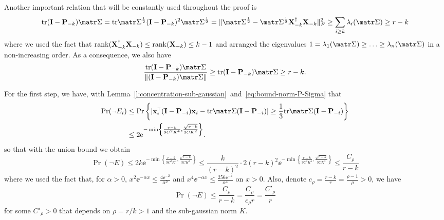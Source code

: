 \documentclass[../../thesis.tex]{subfiles}
\begin{document}

Another important relation that will be constantly used throughout the proof is
\begin{equation}\label{eq:bound-trace-P-Sigma}
  \tr (\I - \P_{-k}) \Sigmab = \tr \Sigmab^{\frac12} (\I - \P_{-k})^2 \Sigmab^{\frac12} =
  \|\Sigmab^{\frac12}-\Sigmab^{\frac12}\X_{-k}^\dagger\X_{-k}\|_F^2\geq
  \sum_{i\geq k}\lambda_i (\Sigmab)\geq r-k
\end{equation}
where we used the fact that $\mathrm{rank}(\mathbf X_{-k}^\dagger \mathbf X_{-k}) \le \mathrm{rank}(\mathbf X_{-k}) \le k-1$ and arranged the eigenvalues $ 1 = \lambda_1(\Sigmab) \ge \ldots \ge \lambda_n(\Sigmab)$ in a non-increasing order. As a consequence, we also have
\begin{equation}\label{eq:bound-norm-P-Sigma}
  \frac{\tr (\I - \P_{-k}) \Sigmab}{ \|  (\I - \P_{-k}) \Sigmab \| } \ge \tr (\I - \P_{-k}) \Sigmab \geq r-k.
\end{equation}

\bigskip

For the first step, we have, with Lemma~\ref{l:concentration-sub-gaussian}~and~\eqref{eq:bound-norm-P-Sigma} that
\begin{align*}
  \Pr (\neg E_i) & \le \Pr \left\{ \lvert \x_i^\top (\I - \P_{-i}) \x_i - \tr \Sigmab (\I - \P_{-i})  \rvert
  \geq \frac13 \tr \Sigmab (\I - \P_{-i}) \right\}                                                               \\
                 & \le 2 \ee^{ - \min \left\{ \frac{ r -k }{9 C^2 K^4}, \frac{\sqrt{r -k} }{3 C K^2} \right\} }. %
\end{align*}
so that with the union bound we obtain
\begin{equation}\label{eq:union-bound-neg-E}
  \Pr (\neg E) \le 2k \ee^{ - \min \left\{ \frac{ r -k }{9 C^2 K^4}, \frac{\sqrt{r -k} }{3 C K^2} \right\} } \le \frac{k}{(r-k)^2} \cdot 2 (r-k)^2 \ee^{ - \min \left\{ \frac{ r -k }{9 C^2 K^4}, \frac{\sqrt{r -k} }{3 C K^2} \right\} } \le \frac{C_\rho}{r - k}
\end{equation}
where we used the fact that, for $\alpha >0$, $x^2 \ee^{-\alpha x} \le \frac{4 \ee^{-2}}{\alpha^2}$ and  $x^4 \ee^{-\alpha x} \le \frac{256 \ee^{-4}}{\alpha^4}$ on $x > 0$. Also, denote $c_\rho = \frac{r - k}r = \frac{\rho - 1}{\rho} > 0$, we have
\begin{equation}\label{eq:proba-E}
  \Pr(\neg E) \le \frac{C_\rho}{r - k} = \frac{C_\rho}{c_\rho r} = \frac{C'_\rho}{r}
\end{equation}
for some $C'_\rho > 0$ that depends on $\rho = r/k > 1$ and the sub-gaussian norm $K$.
\end{document}
